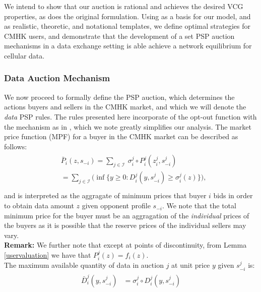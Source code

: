 \documentclass[12pt]{article}
\theoremstyle{definition}
\newcommand{\vs}{\varsigma}
\newcommand{\mcI}{\mathcal{I}}
\newcommand{\g}{\sigma}
\begin{document}
\begin{multicols}{2}
We intend to show that our auction
is rational and achieves the desired VCG properties, as does the original
formulation. Using \cite{zheng} as a basis for our model, and \cite{lazar} as
realistic, theoretic, and notational templates, we define optimal strategies for
CMHK users, and demonstrate that the development of a set PSP auction mechanisms
in a data exchange setting is able achieve a network equilibrium for cellular data. 


\subsubsection{Data Auction Mechanism}\label{datamechanism}
We now proceed to formally define the PSP auction, which determines the actions 
buyers and sellers in the CMHK market, and which we will denote the \emph{data}
PSP rules. The rules presented here incorporate of the opt-out function with the
mechanism as in \cite{lazar}, which we note greatly simplifies our
analysis. 
The market price function (MPF) for a buyer in the CMHK market
can be described as follows:
\begin{align}\label{dataprice}
\begin{split}
    &\bar{P}_i(z, s_{-i}) =\displaystyle\sum_{j\in\mcI} \ \g_i^j \circ P_i^j(z_i^j,
s_{-i}^j) \\
    &= \sum_{j\in\mcI}\bigg(\inf\bigg\lbrace y\ge 0 : 
    {D_i^j}(y,s_{-i}^j) \ge \g_i^j(z) \bigg\rbrace \bigg),\\
\end{split}
\end{align}
and is interpreted as the aggragate of minimum prices that buyer $i$ bids in
order to obtain
data amount $z$ given opponent profile $s_{-i}$. We note that
the total minimum price for the buyer must be an aggragation of the
\emph{individual} prices of the buyers as it is possible that the reserve prices
of the individual sellers may vary.\\
\textbf{Remark:} We further note that except at points of discontinuity, from
Lemma \ref{uservaluation} we have that $P_i^j(z) = f_i(z)$. \\
The maximum available quantity of data in auction
$j$ at unit price $y$ given $s_{-i}^j$ is: 
\begin{align}
\begin{split}\label{datacomposed}
    \bar{D}_i^j(y,s_{-i}^j) &= \g_i^j \circ D_i^j( y,s_{-i}^j)\\

\end{split}
\end{align}
\end{multicols}
\end{document}

